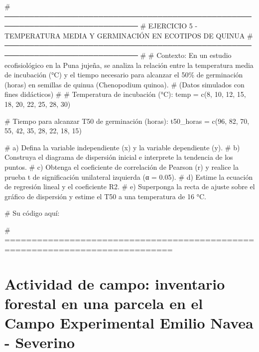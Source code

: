 \documentclass[
  spanish,
  letterpaper,
  DIV=11,
  numbers=noendperiod]{scrreprt}
\newenvironment{Shaded}{\begin{snugshade}}{\end{snugshade}}
\newcommand{\CommentTok}[1]{\textcolor[rgb]{0.37,0.37,0.37}{#1}}
\newcommand{\DecValTok}[1]{\textcolor[rgb]{0.68,0.00,0.00}{#1}}
\newcommand{\FunctionTok}[1]{\textcolor[rgb]{0.28,0.35,0.67}{#1}}
\newcommand{\NormalTok}[1]{\textcolor[rgb]{0.00,0.23,0.31}{#1}}
\newcommand{\OtherTok}[1]{\textcolor[rgb]{0.00,0.23,0.31}{#1}}
\begin{document}
\begin{Shaded}
\begin{Highlighting}[]
\CommentTok{\# ─────────────────────────────────────────────────────────────────────────────}
\CommentTok{\# EJERCICIO 5 {-} TEMPERATURA MEDIA Y GERMINACIÓN EN ECOTIPOS DE QUINUA}
\CommentTok{\# ─────────────────────────────────────────────────────────────────────────────}
\CommentTok{\#}
\CommentTok{\# Contexto: En un estudio ecofisiológico en la Puna jujeña, se analiza la relación entre la temperatura media de incubación (°C) y el tiempo necesario para alcanzar el 50\% de germinación (horas) en semillas de quinua (Chenopodium quinoa).}
\CommentTok{\# (Datos simulados con fines didácticos)}
\CommentTok{\#}
\CommentTok{\# Temperatura de incubación (°C):}
\NormalTok{temp }\OtherTok{=} \FunctionTok{c}\NormalTok{(}\DecValTok{8}\NormalTok{, }\DecValTok{10}\NormalTok{, }\DecValTok{12}\NormalTok{, }\DecValTok{15}\NormalTok{, }\DecValTok{18}\NormalTok{, }\DecValTok{20}\NormalTok{, }\DecValTok{22}\NormalTok{, }\DecValTok{25}\NormalTok{, }\DecValTok{28}\NormalTok{, }\DecValTok{30}\NormalTok{)}

\CommentTok{\# Tiempo para alcanzar T50 de germinación (horas):}
\NormalTok{t50\_horas }\OtherTok{=} \FunctionTok{c}\NormalTok{(}\DecValTok{96}\NormalTok{, }\DecValTok{82}\NormalTok{, }\DecValTok{70}\NormalTok{, }\DecValTok{55}\NormalTok{, }\DecValTok{42}\NormalTok{, }\DecValTok{35}\NormalTok{, }\DecValTok{28}\NormalTok{, }\DecValTok{22}\NormalTok{, }\DecValTok{18}\NormalTok{, }\DecValTok{15}\NormalTok{)}

\CommentTok{\# a) Defina la variable independiente (x) y la variable dependiente (y).}
\CommentTok{\# b) Construya el diagrama de dispersión inicial e interprete la tendencia de los puntos.}
\CommentTok{\# c) Obtenga el coeficiente de correlación de Pearson (r) y realice la prueba t de significación unilateral izquierda (α = 0.05).}
\CommentTok{\# d) Estime la ecuación de regresión lineal y el coeficiente R2.}
\CommentTok{\# e) Superponga la recta de ajuste sobre el gráfico de dispersión y estime el T50 a una temperatura de 16 °C.}

\CommentTok{\# Su código aquí:}

\CommentTok{\# =============================================================================}
\end{Highlighting}
\end{Shaded}


\chapter{Actividad de campo: inventario forestal en una parcela en el
Campo Experimental Emilio Navea -
Severino}\label{actividad-de-campo-inventario-forestal-en-una-parcela-en-el-campo-experimental-emilio-navea---severino}
\end{document}

